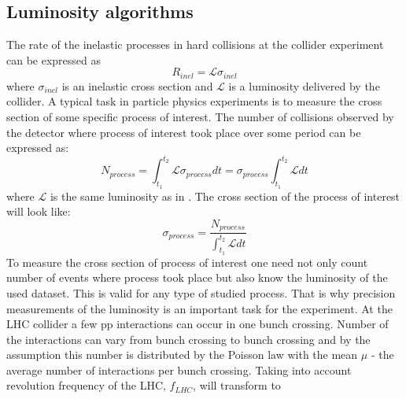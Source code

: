 


\subsection{Luminosity algorithms}
The rate of the inelastic processes in hard collisions at the collider experiment can be expressed as
\begin{equation}
R_{inel} = \mathscr{L} \sigma_{inel}
\label{eq:simpleLumi}
\end{equation}
where $\sigma_{inel}$ is an inelastic cross section and $\mathscr{L}$ is a luminosity delivered by the collider.
A typical task in particle physics experiments is to measure the cross section of some specific process of interest.
The number of collisions observed by the detector where process of interest took place over some period can be expressed as:
\begin{equation}
N_{process} = \int_{t_{1}}^{t_{2}} \mathscr{L} \sigma_{process} dt = \sigma_{process} \int_{t_{1}}^{t_{2}} \mathscr{L} dt
\label{eq:simpleLumi2}
\end{equation}
where $\mathscr{L}$ is the same luminosity as in .
The cross section of the process of interest will look like:
\begin{equation}
\sigma_{process} = \dfrac{N_{process}}{  \int_{t_{1}}^{t_{2}} \mathscr{L} dt}
\label{eq:sigma_proc}
\end{equation}
To measure the cross section of process of interest one need not only count number of events where process took place but also know the luminosity of the used dataset.
This is valid for any type of studied process. 
That is why precision measurements of the luminosity is an important task for the experiment.
At the LHC collider a few pp interactions can occur in one bunch crossing. Number of the interactions can vary from bunch crossing to bunch crossing and by the assumption this number is distributed by the Poisson law with the mean $\mu$ - the average number of interactions per bunch crossing.
Taking into account revolution frequency of the LHC, $f_{LHC}$,  will transform to
